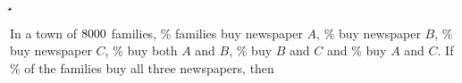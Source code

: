 

\DIVIDE{}\byhundred
\MULTIPLY\vb\byhundred\a
\MULTIPLY\vc\byhundred\b
\MULTIPLY\vd\byhundred\c
\MULTIPLY\ve\byhundred\ab
\MULTIPLY\vf\byhundred\bc
\MULTIPLY\vg\byhundred\ca
\MULTIPLY\vh\byhundred\abc
\EXPR[0]{\na}{\a-\ab-\ca+\abc}
\EXPR[0]{\aunionbunionc}{\a+\b+\c-\ab-\bc-\ca+\abc}
\SUBTRACT\va\aunionbunionc\noabc

\question In a town of $8000$ families, \vb\% families buy newspaper $A$, 
\vc\% buy newspaper $B$, \vd\% buy newspaper $C$, \ve\% buy both $A$ and $B$, 
\vf\% buy $B$ and $C$ and \vg\% buy $A$ and $C$. If \vh\% of the families buy all 
three newspapers, then 


\watchout[-50pt]

